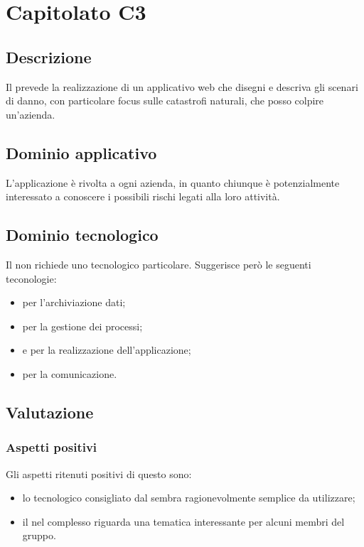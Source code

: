 \documentclass[../StudioDiFattibilita.tex]{subfiles}
\begin{document}
	\section{Capitolato C3}
		\subsection{Descrizione}
			Il  prevede la realizzazione di un applicativo web che disegni e descriva gli scenari di danno, con particolare focus sulle catastrofi naturali, che posso colpire un'azienda.
		\subsection{Dominio applicativo}
			L'applicazione è rivolta a ogni azienda, in quanto chiunque è potenzialmente interessato a conoscere i possibili rischi legati alla loro attività.
		\subsection{Dominio tecnologico} %
			Il  non richiede uno  tecnologico particolare. Suggerisce però le seguenti teconologie:
			\begin{itemize}
				\item \textbf{} per l'archiviazione dati;
				\item \textbf{} per la gestione dei processi;
				\item \textbf{} e \textbf{} per la realizzazione dell'applicazione;
				\item \textbf{} per la comunicazione.
			\end{itemize}
		\subsection{Valutazione}
			\subsubsection{Aspetti positivi}
				Gli aspetti ritenuti positivi di questo  sono:
				\begin{itemize}
					\item lo  tecnologico consigliato dal  sembra ragionevolmente semplice da utilizzare;
					\item il  nel complesso riguarda una tematica interessante per alcuni membri del gruppo.
				\end{itemize}					
\end{document}
